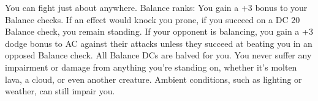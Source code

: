 \skillfeat
{You can fight just about anywhere.}
{Balance ranks:}
{You gain a +3 bonus to your Balance checks.}
{If an effect would knock you prone, if you succeed on a DC 20 Balance check, you remain standing.}
{If your opponent is balancing, you gain a +3 dodge bonus to AC against their attacks unless they succeed at beating you in an opposed Balance check.}
{All Balance DCs are halved for you.}
{You never suffer any impairment or damage from anything you're standing on, whether it's molten lava, a cloud, or even another creature. Ambient conditions, such as lighting or weather, can still impair you.}